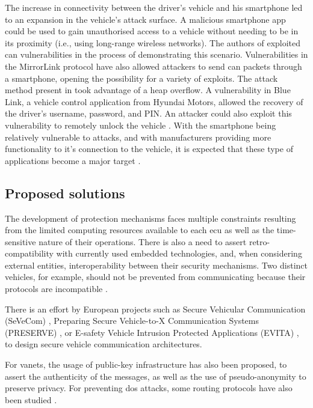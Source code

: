 The increase in connectivity between the driver’s vehicle and his smartphone led to an expansion in the vehicle’s attack surface. A malicious smartphone app could be used to gain unauthorised access to a vehicle without needing to be in its proximity (i.e., using long-range wireless networks). The authors of \cite{Woo2015} exploited \gls{can} vulnerabilities in the process of demonstrating this scenario. Vulnerabilities in the MirrorLink protocol have also allowed attackers to send \gls{can} packets through a smartphone, opening the possibility for a variety of exploits. The attack method present in \cite{mazloom2016security} took advantage of a heap overflow. A vulnerability in Blue Link, a vehicle control application from Hyundai Motors, allowed the recovery of the driver's username, password, and PIN. An attacker could also exploit this vulnerability to remotely unlock the vehicle \citep{toddbluelink}. With the smartphone being relatively vulnerable to attacks, and with manufacturers providing more functionality to it's connection to the vehicle, it is expected that these type of applications become a major target \citep{Kim2021}.

\subsection{Proposed solutions}

The development of protection mechanisms faces multiple constraints resulting from the limited computing resources available to each \gls{ecu} as well as the time-sensitive nature of their operations. There is also a need to assert retro-compatibility with currently used embedded technologies, and, when considering external entities, interoperability between their security mechanisms. Two distinct vehicles, for example, should not be prevented from communicating because their protocols are incompatible \citep{Studnia2013}.\par

There is an effort by European projects such as Secure Vehicular Communication (SeVeCom) \citep{Kargl2008}, Preparing Secure Vehicle-to-X Communication Systems (PRESERVE) \citep{PRESERVE}, or E-safety Vehicle Intrusion Protected Applications (EVITA) \citep{EVITA}, to design secure vehicle communication architectures.\par

For \glspl{vanet}, the usage of public-key infrastructure has also been proposed, to assert the authenticity of the messages, as well as the use of pseudo-anonymity to preserve privacy. For preventing \gls{dos} attacks, some routing protocols have also been studied \citep{Hasrouny2017}.\par

